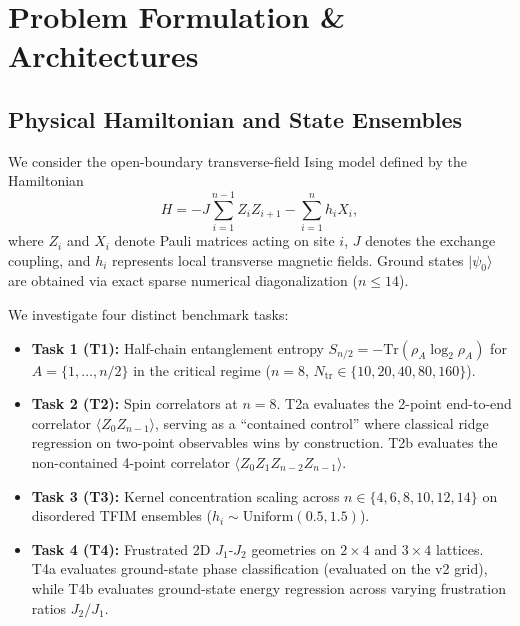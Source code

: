 \documentclass[conference]{IEEEtran}
\begin{document}
\section{Problem Formulation \& Architectures}

\subsection{Physical Hamiltonian and State Ensembles}
We consider the open-boundary transverse-field Ising model defined by the Hamiltonian
\begin{equation}
H = -J \sum_{i=1}^{n-1} Z_i Z_{i+1} - \sum_{i=1}^n h_i X_i,
\label{eq:tfim}
\end{equation}
where $Z_i$ and $X_i$ denote Pauli matrices acting on site $i$, $J$ denotes the exchange coupling, and $h_i$ represents local transverse magnetic fields. Ground states $|\psi_0\rangle$ are obtained via exact sparse numerical diagonalization ($n \le 14$).

We investigate four distinct benchmark tasks:
\begin{itemize}
    \item \textbf{Task 1 (T1):} Half-chain entanglement entropy $S_{n/2} = -\text{Tr}(\rho_{A} \log_2 \rho_{A})$ for $A=\{1,\dots,n/2\}$ in the critical regime ($n=8$, $N_{\text{tr}} \in \{10, 20, 40, 80, 160\}$).
    \item \textbf{Task 2 (T2):} Spin correlators at $n=8$. T2a evaluates the 2-point end-to-end correlator $\langle Z_0 Z_{n-1} \rangle$, serving as a ``contained control'' where classical ridge regression on two-point observables wins by construction. T2b evaluates the non-contained 4-point correlator $\langle Z_0 Z_1 Z_{n-2} Z_{n-1} \rangle$.
    \item \textbf{Task 3 (T3):} Kernel concentration scaling across $n \in \{4, 6, 8, 10, 12, 14\}$ on disordered TFIM ensembles ($h_i \sim \text{Uniform}(0.5, 1.5)$).
    \item \textbf{Task 4 (T4):} Frustrated 2D $J_1$-$J_2$ geometries on $2 \times 4$ and $3 \times 4$ lattices. T4a evaluates ground-state phase classification (evaluated on the v2 grid), while T4b evaluates ground-state energy regression across varying frustration ratios $J_2/J_1$.
\end{itemize}
\end{document}
